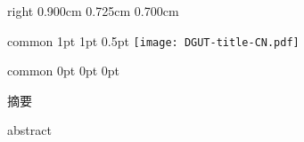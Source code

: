 \documentclass[
    report,     %
    oneside,    %
    UTF8,       %
    zihao=-4    %
]{config}
\begin{document}
\CoverPage
    {right} %
    {0.900cm} %
    {0.725cm} %
    {0.700cm} %


\Header
    {common} %
    {1pt} %
    {1pt} %
    {0.5pt} %
    {} %
    {\texttt{[image: DGUT-title-CN.pdf]}} %
    {} %


\Footer
    {common} %
    {0pt} %
    {0pt} %
    {0pt} %
    {} %
    {\thepage} %
    {} %


\SetRomanPageNumber{} %


\begin{abstractCN}[0.6cm] %

摘要

\def\keywordsCN{关键词1，关键词2，关键词3，关键词4，关键词5}

\end{abstractCN}


\begin{abstractEN}[0.6cm] %

abstract

\def\keywordsEN{keyword 1，keyword 2，keyword 3，keyword 4，keyword 5}

\end{abstractEN}


\end{document}
